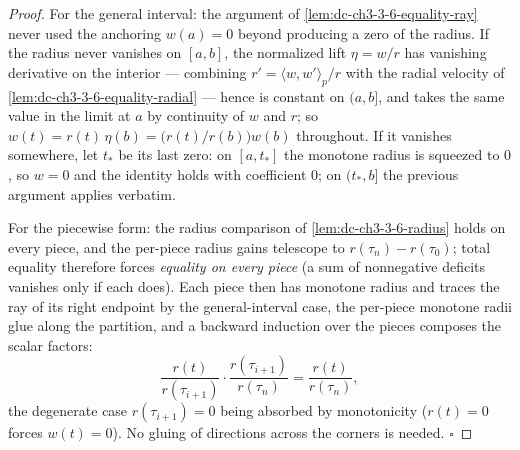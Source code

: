 \begin{proof}
  \leanok
  For the general interval: the argument of
  \cref{lem:dc-ch3-3-6-equality-ray} never used the anchoring $w(a)=0$
  beyond producing a zero of the radius. If the radius never vanishes on
  $[a,b]$, the normalized lift $\eta=w/r$ has vanishing derivative on the
  interior — combining $r'=\langle w,w'\rangle_p/r$ with the radial velocity
  of \cref{lem:dc-ch3-3-6-equality-radial} — hence is constant on $(a,b]$,
  and takes the same value in the limit at $a$ by continuity of $w$ and $r$;
  so $w(t)=r(t)\,\eta(b)=\bigl(r(t)/r(b)\bigr)w(b)$ throughout. If it
  vanishes somewhere, let $t_*$ be its last zero: on $[a,t_*]$ the monotone
  radius is squeezed to $0$, so $w=0$ and the identity holds with
  coefficient $0$; on $(t_*,b]$ the previous argument applies verbatim.

  For the piecewise form: the radius comparison of
  \cref{lem:dc-ch3-3-6-radius} holds on every piece, and the per-piece
  radius gains telescope to $r(\tau_n)-r(\tau_0)$; total equality therefore
  forces \emph{equality on every piece} (a sum of nonnegative deficits
  vanishes only if each does). Each piece then has monotone radius and
  traces the ray of its right endpoint by the general-interval case, the
  per-piece monotone radii glue along the partition, and a backward
  induction over the pieces composes the scalar factors:
  $$\frac{r(t)}{r(\tau_{i+1})}\cdot\frac{r(\tau_{i+1})}{r(\tau_n)}
    =\frac{r(t)}{r(\tau_n)},$$
  the degenerate case $r(\tau_{i+1})=0$ being absorbed by monotonicity
  ($r(t)=0$ forces $w(t)=0$). No gluing of directions across the corners is
  needed. $\square$
\end{proof}

